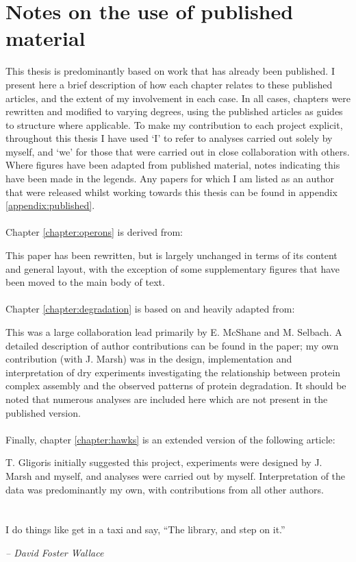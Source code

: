 \documentclass[a4paper,11pt,twoside,openright]{scrbook}
\begin{document}
\chapter*{Notes on the use of published material}
This thesis is predominantly based on work that has already been published. I
present here a brief description of how each chapter relates to these published
articles, and the extent of my involvement in each case. In all cases, chapters
were rewritten and modified to varying degrees, using the published articles as
guides to structure where applicable. To make my contribution to each project
explicit, throughout this thesis I have used `I' to refer to analyses carried
out solely by myself, and `we' for those that were carried out in close
collaboration with others. Where figures have been adapted from published
material, notes indicating this have been made in the legends. Any papers for
which I am listed as an author that were released whilst working towards this
thesis can be found in appendix \ref{appendix:published}.
\\~\\
Chapter \ref{chapter:operons} is derived from:
\begin{quote}
\end{quote}
This paper has been rewritten, but is largely unchanged in terms of its content
and general layout, with the exception of some supplementary figures that have
been moved to the main body of text.
\\~\\
Chapter \ref{chapter:degradation} is based on and heavily adapted from:
\begin{quote}
\end{quote}
This was a large collaboration lead primarily by E. McShane and M. Selbach. A
detailed description of author contributions can be found in the paper; my own
contribution (with J. Marsh) was in the design, implementation and
interpretation of dry experiments investigating the relationship between protein
complex assembly and the observed patterns of protein degradation. It should be
noted that numerous analyses are included here which are not present in the
published version.
\\~\\
Finally, chapter \ref{chapter:hawks} is an extended version of the following
article:
\clearpage
\begin{quote}
\end{quote}
T. Gligoris initially suggested this project, experiments were designed by J.
Marsh and myself, and analyses were carried out by myself. Interpretation of the
data was predominantly my own, with contributions from all other authors.

\chapter*{}
\setlength{\epigraphwidth}{0.38\textwidth}
\epigraph{I do things like get in a taxi and say, ``The library, and step on
it.''}{\textit{-- David Foster Wallace}}
\end{document}

